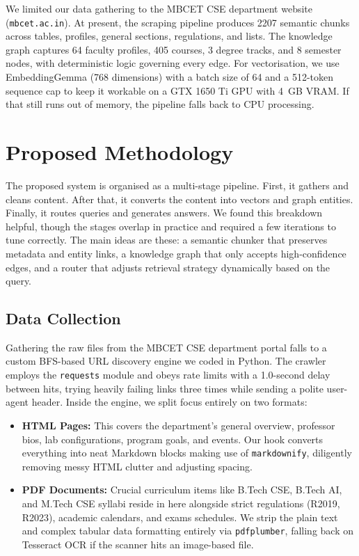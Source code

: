 \documentclass[12pt,a4paper]{report}
\begin{document}
We limited our data gathering to the MBCET CSE department website (\texttt{mbcet.ac.in}). At present, the scraping pipeline produces 2207 semantic chunks across tables, profiles, general sections, regulations, and lists. The knowledge graph captures 64 faculty profiles, 405 courses, 3 degree tracks, and 8 semester nodes, with deterministic logic governing every edge. For vectorisation, we use EmbeddingGemma (768 dimensions) with a batch size of 64 and a 512-token sequence cap to keep it workable on a GTX 1650 Ti GPU with 4~GB VRAM. If that still runs out of memory, the pipeline falls back to CPU processing.

\section{Proposed Methodology}

The proposed system is organised as a multi-stage pipeline. First, it gathers and cleans content. After that, it converts the content into vectors and graph entities. Finally, it routes queries and generates answers. We found this breakdown helpful, though the stages overlap in practice and required a few iterations to tune correctly. The main ideas are these: a semantic chunker that preserves metadata and entity links, a knowledge graph that only accepts high-confidence edges, and a router that adjusts retrieval strategy dynamically based on the query.

\subsection{Data Collection}

Gathering the raw files from the MBCET CSE department portal falls to a custom BFS-based URL discovery engine we coded in Python. The crawler employs the \texttt{requests} module and obeys rate limits with a 1.0-second delay between hits, trying heavily failing links three times while sending a polite user-agent header. Inside the engine, we split focus entirely on two formats:

\begin{itemize}
  \item \textbf{HTML Pages:} This covers the department's general overview, professor bios, lab configurations, program goals, and events. Our hook converts everything into neat Markdown blocks making use of \texttt{markdownify}, diligently removing messy HTML clutter and adjusting spacing.
  \item \textbf{PDF Documents:} Crucial curriculum items like B.Tech CSE, B.Tech AI, and M.Tech CSE syllabi reside in here alongside strict regulations (R2019, R2023), academic calendars, and exams schedules. We strip the plain text and complex tabular data formatting entirely via \texttt{pdfplumber}, falling back on Tesseract OCR if the scanner hits an image-based file.
\end{itemize}
\end{document}
